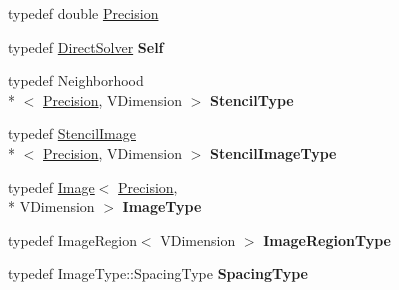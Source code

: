 \begin{DoxyCompactItemize}
\item 
typedef double \hyperlink{classitk_1_1mad_1_1_direct_solver_a352048c2b5b60e880b2d63c700df82ad}{Precision}
\item 
\hypertarget{classitk_1_1mad_1_1_direct_solver_a2f4037f255f7e1a683fe850856dc26a4}{typedef \hyperlink{classitk_1_1mad_1_1_direct_solver}{Direct\-Solver} {\bfseries Self}}\label{classitk_1_1mad_1_1_direct_solver_a2f4037f255f7e1a683fe850856dc26a4}

\item 
\hypertarget{classitk_1_1mad_1_1_direct_solver_a9c6a10512e51568cf6d4e95749f8d933}{typedef Neighborhood\\*
$<$ \hyperlink{classitk_1_1mad_1_1_direct_solver_a352048c2b5b60e880b2d63c700df82ad}{Precision}, V\-Dimension $>$ {\bfseries Stencil\-Type}}\label{classitk_1_1mad_1_1_direct_solver_a9c6a10512e51568cf6d4e95749f8d933}

\item 
\hypertarget{classitk_1_1mad_1_1_direct_solver_aac772c5caef076e12a96e9e066334c1d}{typedef \hyperlink{classitk_1_1mad_1_1_stencil_image}{Stencil\-Image}\\*
$<$ \hyperlink{classitk_1_1mad_1_1_direct_solver_a352048c2b5b60e880b2d63c700df82ad}{Precision}, V\-Dimension $>$ {\bfseries Stencil\-Image\-Type}}\label{classitk_1_1mad_1_1_direct_solver_aac772c5caef076e12a96e9e066334c1d}

\item 
\hypertarget{classitk_1_1mad_1_1_direct_solver_a78da312b919002bfc3b8e133dcebfa92}{typedef \hyperlink{class_image}{Image}$<$ \hyperlink{classitk_1_1mad_1_1_direct_solver_a352048c2b5b60e880b2d63c700df82ad}{Precision}, \\*
V\-Dimension $>$ {\bfseries Image\-Type}}\label{classitk_1_1mad_1_1_direct_solver_a78da312b919002bfc3b8e133dcebfa92}

\item 
\hypertarget{classitk_1_1mad_1_1_direct_solver_a1ced8d5af7e8d6dd9ca9874c417d61ec}{typedef Image\-Region$<$ V\-Dimension $>$ {\bfseries Image\-Region\-Type}}\label{classitk_1_1mad_1_1_direct_solver_a1ced8d5af7e8d6dd9ca9874c417d61ec}

\item 
\hypertarget{classitk_1_1mad_1_1_direct_solver_aa906038c251c5fe5c2f7cd4f3b27c0d9}{typedef Image\-Type\-::\-Spacing\-Type {\bfseries Spacing\-Type}}\label{classitk_1_1mad_1_1_direct_solver_aa906038c251c5fe5c2f7cd4f3b27c0d9}


\end{DoxyCompactItemize}
